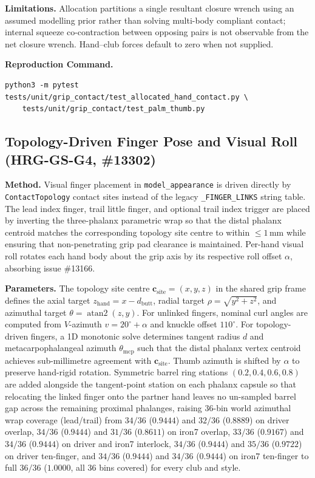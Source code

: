 \documentclass[11pt,a4paper]{article}
\begin{document}
\textbf{Limitations.} Allocation partitions a single resultant closure wrench
using an assumed modelling prior rather than solving multi-body compliant contact; internal squeeze co-contraction
between opposing pairs is not observable from the net closure wrench. Hand--club forces default to zero when not supplied.

\textbf{Reproduction Command.}
\begin{verbatim}
python3 -m pytest tests/unit/grip_contact/test_allocated_hand_contact.py \
    tests/unit/grip_contact/test_palm_thumb.py
\end{verbatim}

\subsection{Topology-Driven Finger Pose and Visual Roll (HRG-GS-G4, \#13302)}
\textbf{Method.} Visual finger placement in \texttt{model\_appearance} is driven directly by \texttt{ContactTopology} contact sites instead of the legacy \texttt{\_FINGER\_LINKS} string table. The lead index finger, trail little finger, and optional trail index trigger are placed by inverting the three-phalanx parametric wrap so that the distal phalanx centroid matches the corresponding topology site centre to within $\le 1$\,mm while ensuring that non-penetrating grip pad clearance is maintained. Per-hand visual roll rotates each hand body about the grip axis by its respective roll offset $\alpha$, absorbing issue \#13166.

\textbf{Parameters.} The topology site centre $\mathbf{c}_{\mathrm{site}} = (x, y, z)$ in the shared grip frame defines the axial target $z_{\mathrm{hand}} = x - d_{\mathrm{butt}}$, radial target $\rho = \sqrt{y^2+z^2}$, and azimuthal target $\theta = \operatorname{atan2}(z, y)$. For unlinked fingers, nominal curl angles are computed from $V$-azimuth $v = 20^\circ + \alpha$ and knuckle offset $110^\circ$. For topology-driven fingers, a 1D monotonic solve determines tangent radius $d$ and metacarpophalangeal azimuth $\theta_{\mathrm{mcp}}$ such that the distal phalanx vertex centroid achieves sub-millimetre agreement with $\mathbf{c}_{\mathrm{site}}$. Thumb azimuth is shifted by $\alpha$ to preserve hand-rigid rotation. Symmetric barrel ring stations $(0.2, 0.4, 0.6, 0.8)$ are added alongside the tangent-point station on each phalanx capsule so that relocating the linked finger onto the partner hand leaves no un-sampled barrel gap across the remaining proximal phalanges, raising 36-bin world azimuthal wrap coverage (lead/trail) from $34/36$ ($0.9444$) and $32/36$ ($0.8889$) on driver overlap, $34/36$ ($0.9444$) and $31/36$ ($0.8611$) on iron7 overlap, $33/36$ ($0.9167$) and $34/36$ ($0.9444$) on driver and iron7 interlock, $34/36$ ($0.9444$) and $35/36$ ($0.9722$) on driver ten-finger, and $34/36$ ($0.9444$) and $34/36$ ($0.9444$) on iron7 ten-finger to full $36/36$ ($1.0000$, all 36 bins covered) for every club and style.
\end{document}
